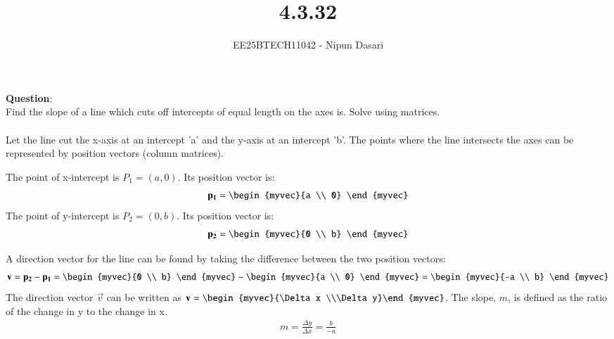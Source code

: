 \documentclass[journal]{IEEEtran}
\begin{document}
	
	
	\vspace{3cm}
	
	\title{4.3.32}
	\author{EE25BTECH11042 - Nipun Dasari}
	\maketitle
	
	\renewcommand{\thefigure}{\theenumi}
	\renewcommand{\thetable}{\theenumi}
	\setlength{\intextsep}{10pt} %
	
	
	\renewcommand{\thetable}{\theenumi}
	
	\textbf{Question}:\\
	Find the slope of a line which cuts off intercepts of equal length on the axes is. Solve using matrices. \\ 
	\solution \\
	
	Let the line cut the x-axis at an intercept 'a' and the y-axis at an intercept 'b'. The points where the line intersects the axes can be represented by position vectors (column matrices).
	
	The point of x-intercept is $P_1 = (a, 0)$. Its position vector is:
	\begin{align}
		\vec{p_1} = \begin{myvec}{a \\ 0} \end{myvec}
	\end{align}
	The point of y-intercept is $P_2 = (0, b)$. Its position vector is:
	\begin{align}
		\vec{p_2} = \begin{myvec}{0 \\ b} \end{myvec}
	\end{align}
	
	A direction vector for the line can be found by taking the difference between the two position vectors:
	\begin{align}
		\vec{v} = \vec{p_2} - \vec{p_1} = \begin{myvec}{0 \\ b} \end{myvec} - \begin{myvec}{a \\ 0} \end{myvec} = \begin{myvec}{-a \\ b} \end{myvec} \label{eq:dir_vec}
	\end{align}
	The direction vector $\vec{v}$ can be written as $\vec{v} = \begin{myvec}{\Delta x \\\Delta y}\end{myvec}$. The slope, $m$, is defined as the ratio of the change in y to the change in x.
	\begin{align}
		m = \frac{\Delta y}{\Delta x} = \frac{b}{-a} \label{0.4}
	\end{align}
	
\end{document}
